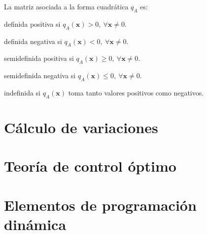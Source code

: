\documentclass[8pt,a4paper]{extarticle}
\begin{document}
\begin{multicols}{3}
\begin{boxcor}
	La matriz asociada a la forma cuadrática $q_A$ es:
	\begin{eqlist}
	\item definida positiva si $q_A(\mathbf{x}) > 0,\ \forall \mathbf{x} \neq 0$.
	\item definida negativa si $q_A(\mathbf{x}) < 0,\ \forall \mathbf{x} \neq 0$.
	\item semidefinida positiva si $q_A(\mathbf{x}) \ge 0,\ \forall \mathbf{x} \neq 0$.
	\item semidefinida negativa si $q_A(\mathbf{x}) \le 0,\ \forall \mathbf{x} \neq 0$.
	\item indefinida si $q_A(\mathbf{x})$ toma tanto valores positivos como negativos.
	\end{eqlist}
\end{boxcor}

\newpage

\section{Cálculo de variaciones}

\newpage

\section{Teoría de control óptimo}

\newpage

\section{Elementos de programación dinámica}

\vfill\eject
\columnbreak
\end{multicols}
\end{document}

